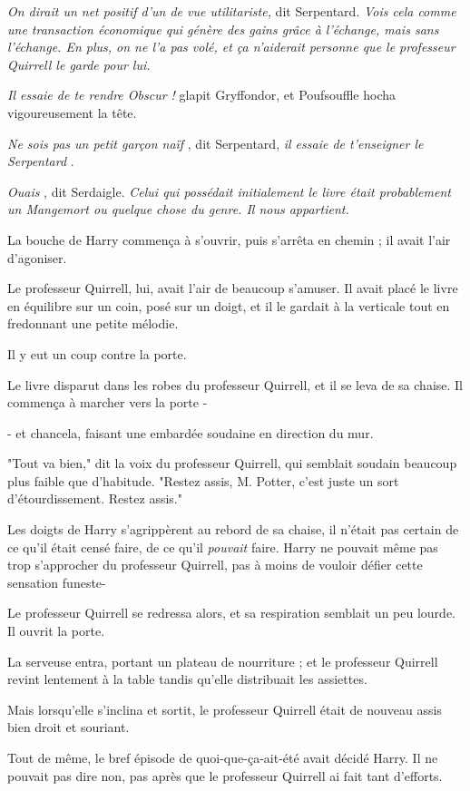 \emph{On dirait un net positif d'un de vue utilitariste, } dit Serpentard. \emph{Vois cela comme une transaction économique qui génère des gains grâce à l'échange, mais sans l'échange. En plus, on ne l'a pas volé, et ça n'aiderait personne que le professeur Quirrell le garde pour lui.} 

\emph{Il essaie de te rendre Obscur !}  glapit Gryffondor, et Poufsouffle hocha vigoureusement la tête.

\emph{Ne sois pas un petit garçon naïf} , dit Serpentard, \emph{il essaie de t'enseigner le Serpentard} .

\emph{Ouais} , dit Serdaigle. \emph{Celui qui possédait initialement le livre était probablement un Mangemort ou quelque chose du genre. Il nous appartient.} 

La bouche de Harry commença à s'ouvrir, puis s'arrêta en chemin ; il avait l'air d'agoniser.

Le professeur Quirrell, lui, avait l'air de beaucoup s'amuser. Il avait placé le livre en équilibre sur un coin, posé sur un doigt, et il le gardait à la verticale tout en fredonnant une petite mélodie.

Il y eut un coup contre la porte.

Le livre disparut dans les robes du professeur Quirrell, et il se leva de sa chaise. Il commença à marcher vers la porte -

- et chancela, faisant une embardée soudaine en direction du mur.

"Tout va bien," dit la voix du professeur Quirrell, qui semblait soudain beaucoup plus faible que d'habitude. "Restez assis, M. Potter, c'est juste un sort d'étourdissement. Restez assis."

Les doigts de Harry s'agrippèrent au rebord de sa chaise, il n'était pas certain de ce qu'il était censé faire, de ce qu'il \emph{pouvait}  faire. Harry ne pouvait même pas trop s'approcher du professeur Quirrell, pas à moins de vouloir défier cette sensation funeste-

Le professeur Quirrell se redressa alors, et sa respiration semblait un peu lourde. Il ouvrit la porte.

La serveuse entra, portant un plateau de nourriture ; et le professeur Quirrell revint lentement à la table tandis qu'elle distribuait les assiettes.

Mais lorsqu'elle s'inclina et sortit, le professeur Quirrell était de nouveau assis bien droit et souriant.

Tout de même, le bref épisode de quoi-que-ça-ait-été avait décidé Harry. Il ne pouvait pas dire non, pas après que le professeur Quirrell ai fait tant d'efforts.

